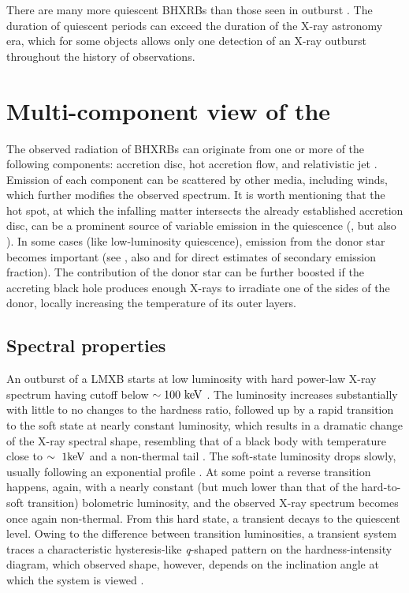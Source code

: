 There are many more quiescent \glspl{BHXRB} than those seen in outburst \citep{Shao2020}.
The duration of quiescent periods can exceed the duration of the X-ray astronomy era, which for some objects allows only one detection of an X-ray outburst throughout the history of observations.


\section{Multi-component view of the }
The observed radiation of \glspl{BHXRB} can originate from one or more of the following components: accretion disc, hot accretion flow, and relativistic jet \citep[see][]{Poutanen2014a,Uttley2014}.
Emission of each component can be scattered by other media, including winds, which further modifies the observed spectrum.
It is worth mentioning that the hot spot, at which the infalling matter intersects the already established accretion disc, can be a prominent source of variable emission in the quiescence (\citealt{Smak1970,Lyutyi1973}, but also \citealt{Bisikalo1998}).
In some cases (like low-luminosity quiescence), emission from the donor star becomes important (see \citealt{Charles2006}, also \citet{Chevalier1989} and \citet{Heida2017} for direct estimates of secondary emission fraction).
The contribution of the donor star can be further boosted if the accreting black hole produces enough X-rays to irradiate one of the sides of the donor, locally increasing the temperature of its outer layers.



\subsection{Spectral properties}
An outburst of a \gls{LMXB} starts at low luminosity with hard power-law X-ray spectrum having cutoff below $\sim 100~\mathrm{keV}$ \citep{Belloni2011}.
The luminosity increases substantially with little to no changes to the hardness ratio, followed up by a rapid transition to the soft state at nearly constant luminosity, which results in a dramatic change of the X-ray spectral shape, resembling that of a black body with temperature close to $\sim~1\mathrm{keV}$ and a non-thermal tail \citep{Zdziarski2004a, McClintock2006, Done2007}.
The soft-state luminosity drops slowly, usually following an exponential profile \citep{Lasota2001}.
At some point a reverse transition happens, again, with a nearly constant (but much lower than that of the hard-to-soft transition) bolometric luminosity, and the observed X-ray spectrum becomes once again non-thermal.
From this hard state, a transient decays to the quiescent level.
Owing to the difference between transition luminosities, a transient system traces a characteristic hysteresis-like \textit{q}-shaped pattern on the hardness-intensity diagram, which observed shape, however, depends on the inclination angle at which the system is viewed \citep{MunozDarias2013}.


